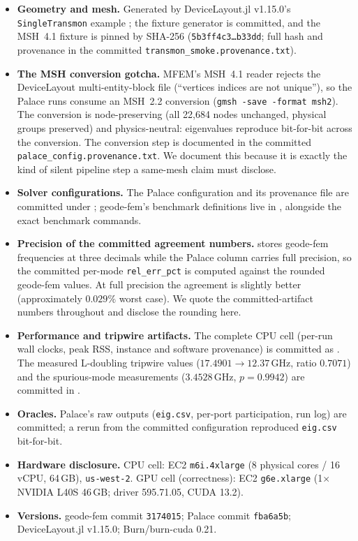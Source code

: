 \documentclass{anvil-paper}
\begin{document}
\begin{itemize}
  \item \textbf{Geometry and mesh.} Generated by DeviceLayout.jl v1.15.0's
    \texttt{SingleTransmon} example \citep{devicelayout}; the fixture
    generator is committed, and the MSH~4.1 fixture is pinned by SHA-256
    (\texttt{5b3ff4c3\ldots{}b33dd}; full hash and provenance in the
    committed \texttt{transmon\_smoke.provenance.txt}).
  \item \textbf{The MSH conversion gotcha.} MFEM's MSH~4.1 reader rejects
    the DeviceLayout multi-entity-block file (``vertices indices are not
    unique''), so the Palace runs consume an MSH~2.2 conversion
    (\texttt{gmsh -save -format msh2}). The conversion is node-preserving
    (all 22{,}684 nodes unchanged, physical groups preserved) and
    physics-neutral: eigenvalues reproduce bit-for-bit across the
    conversion. The conversion step is documented in the committed
    \texttt{palace\_config.provenance.txt}. We document this because it is
    exactly the kind of silent pipeline step a same-mesh claim must
    disclose.
  \item \textbf{Solver configurations.} The Palace configuration and its
    provenance file are committed under
    ; geode-fem's benchmark
    definitions live in ,
    alongside the exact benchmark commands.
  \item \textbf{Precision of the committed agreement numbers.}
     stores geode-fem
    frequencies at three decimals while the Palace column carries full
    precision, so the committed per-mode \texttt{rel\_err\_pct} is
    computed against the rounded geode-fem values. At full precision the
    agreement is slightly better (approximately $0.029\%$ worst case). We
    quote the committed-artifact numbers throughout and disclose the
    rounding here.
  \item \textbf{Performance and tripwire artifacts.} The complete CPU cell
    (per-run wall clocks, peak RSS, instance and software provenance) is
    committed as . The
    measured L-doubling tripwire values ($17.4901 \to 12.37$\,GHz, ratio
    $0.7071$) and the spurious-mode measurements ($3.4528$\,GHz,
    $p = 0.9942$) are committed in
    .
  \item \textbf{Oracles.} Palace's raw outputs (\texttt{eig.csv},
    per-port participation, run log) are committed; a rerun from the
    committed configuration reproduced \texttt{eig.csv} bit-for-bit.
  \item \textbf{Hardware disclosure.} CPU cell: EC2 \texttt{m6i.4xlarge}
    (8 physical cores / 16 vCPU, 64\,GB), \texttt{us-west-2}. GPU cell
    (correctness): EC2 \texttt{g6e.xlarge} (1$\times$ NVIDIA L40S 46\,GB;
    driver 595.71.05, CUDA 13.2).
  \item \textbf{Versions.} geode-fem commit \texttt{3174015}; Palace
    commit \texttt{fba6a5b}; DeviceLayout.jl v1.15.0; Burn/burn-cuda 0.21.
\end{itemize}
\end{document}
